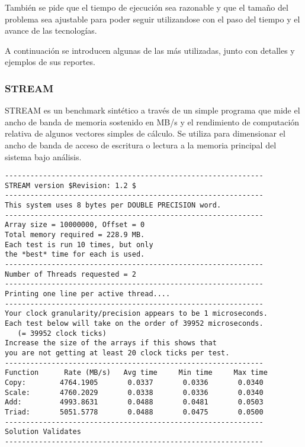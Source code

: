 \documentclass[a4paper]{report}
\begin{document}
\bigskip

Tambi\'en se pide que el tiempo de ejecuci\'on sea razonable y que el tama\~no del problema sea ajustable para poder
seguir utilizandose con el paso del tiempo y el avance de las tecnolog\'ias.

\bigskip

A continuaci\'on se introducen algunas de las m\'as utilizadas, junto con detalles y ejemplos de sus reportes.

\subsubsection{STREAM}

STREAM \cite{stream} es un benchmark sint\'etico a trav\'es de un simple programa que mide el ancho de banda de
memoria sostenido en MB/s y el rendimiento de computaci\'on relativa de algunos vectores simples de c\'alculo.
Se utiliza para dimensionar el ancho de banda de acceso de escritura o lectura a la memoria principal del sistema
 bajo an\'alisis.

\begin{verbatim}
-------------------------------------------------------------
STREAM version $Revision: 1.2 $
-------------------------------------------------------------
This system uses 8 bytes per DOUBLE PRECISION word.
-------------------------------------------------------------
Array size = 10000000, Offset = 0
Total memory required = 228.9 MB.
Each test is run 10 times, but only
the *best* time for each is used.
-------------------------------------------------------------
Number of Threads requested = 2
-------------------------------------------------------------
Printing one line per active thread....
-------------------------------------------------------------
Your clock granularity/precision appears to be 1 microseconds.
Each test below will take on the order of 39952 microseconds.
   (= 39952 clock ticks)
Increase the size of the arrays if this shows that
you are not getting at least 20 clock ticks per test.
-------------------------------------------------------------
Function      Rate (MB/s)   Avg time     Min time     Max time
Copy:        4764.1905       0.0337       0.0336       0.0340
Scale:       4760.2029       0.0338       0.0336       0.0340
Add:         4993.8631       0.0488       0.0481       0.0503
Triad:       5051.5778       0.0488       0.0475       0.0500
-------------------------------------------------------------
Solution Validates
-------------------------------------------------------------
\end{verbatim}
\end{document}
